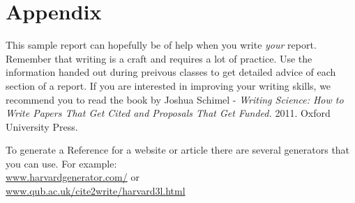 \documentclass[fleqn,10pt]{SelfArx} %
\begin{document}
\section*{Appendix} %
\setcounter{figure}{0}\renewcommand{}\renewcommand{}  

\noindent
This sample report can hopefully be of help when you write \textit{your} report. Remember that writing is a craft and requires a lot of practice. Use the information handed out during preivous classes to get detailed advice of each section of a report. If you are interested in improving your writing skills, we recommend you to read the book by Joshua Schimel -\textit{ Writing Science: How to Write Papers That Get Cited and Proposals That Get Funded.} 2011. Oxford University Press.

To generate a Reference for a website or article there are several generators that you can use. For example: \\
\url{www.harvardgenerator.com/} or \\
\url{www.qub.ac.uk/cite2write/harvard3l.html}
\end{document}
